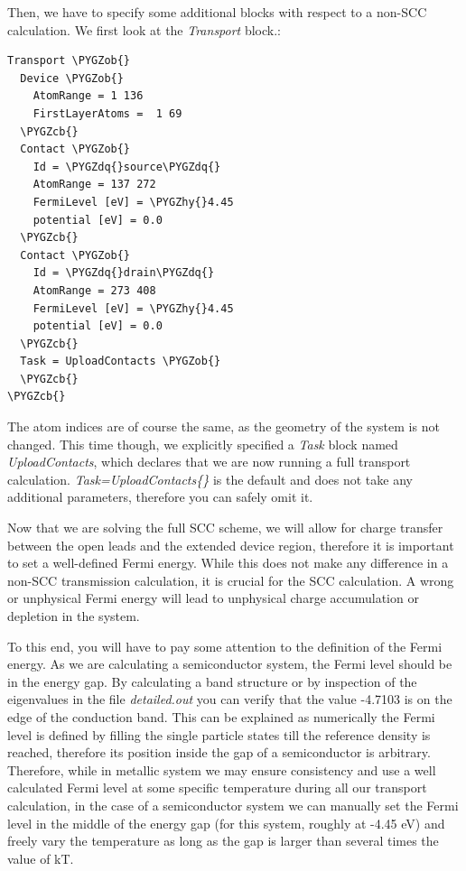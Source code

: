 \documentclass[a4paper,11pt,english]{sphinxmanual}
\def\PYGZob{\char`\{}
\def\PYGZcb{\char`\}}
\def\PYGZhy{\char`\-}
\def\PYGZdq{\char`\"}
\begin{document}
{{Then, we have to specify some additional blocks with respect to a
non-SCC calculation. We first look at the \emph{Transport} block.:

\begin{Verbatim}[commandchars=\\\{\}]
Transport \PYGZob{}
  Device \PYGZob{}
    AtomRange = 1 136
    FirstLayerAtoms =  1 69
  \PYGZcb{}
  Contact \PYGZob{}
    Id = \PYGZdq{}source\PYGZdq{}
    AtomRange = 137 272
    FermiLevel [eV] = \PYGZhy{}4.45
    potential [eV] = 0.0
  \PYGZcb{}
  Contact \PYGZob{}
    Id = \PYGZdq{}drain\PYGZdq{}
    AtomRange = 273 408
    FermiLevel [eV] = \PYGZhy{}4.45
    potential [eV] = 0.0
  \PYGZcb{}
  Task = UploadContacts \PYGZob{}
  \PYGZcb{}
\PYGZcb{}
\end{Verbatim}

The atom indices are of course the same, as the geometry of the system
is not changed. This time though, we explicitly specified a \emph{Task}
block named \emph{UploadContacts}, which declares that we are now running a
full transport calculation. \emph{Task=UploadContacts\{\}} is the default and
does not take any additional parameters, therefore you can safely omit
it.

Now that we are solving the full SCC scheme, we will allow for charge
transfer between the open leads and the extended device region,
therefore it is important to set a well-defined Fermi energy. While
this does not make any difference in a non-SCC transmission
calculation, it is crucial for the SCC calculation. A wrong or
unphysical Fermi energy will lead to unphysical charge accumulation or
depletion in the system.

To this end, you will have to pay some attention to the definition of
the Fermi energy. As we are calculating a semiconductor system, the
Fermi level should be in the energy gap. By calculating a band
structure or by inspection of the eigenvalues in the file
\emph{detailed.out} you can verify that the value -4.7103 is on the edge of
the conduction band. This can be explained as numerically the Fermi
level is defined by filling the single particle states till the
reference density is reached, therefore its position inside the gap of
a semiconductor is arbitrary. Therefore, while in metallic system we
may ensure consistency and use a well calculated Fermi level at some
specific temperature during all our transport calculation, in the case
of a semiconductor system we can manually set the Fermi level in the
middle of the energy gap (for this system, roughly at -4.45 eV) and
freely vary the temperature as long as the gap is larger than several
times the value of kT.

}}
\end{document}

